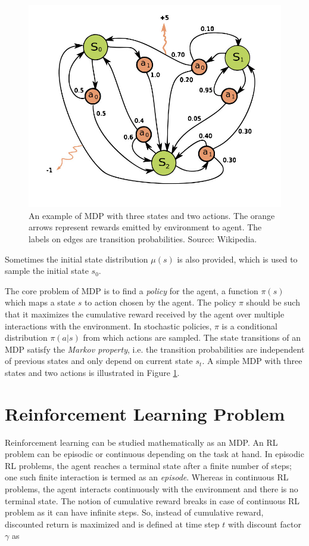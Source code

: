 \begin{figure}[!htb]
    \centering
    \includegraphics[width=.8\linewidth]{figures/02/mdp.jpg}
    \caption{An example of MDP with three states and two actions. The orange arrows represent rewards emitted by environment to agent. The labels on edges are transition probabilities. Source: Wikipedia.}
    \label{fig:02_mdp}
\end{figure}

Sometimes the initial state distribution $\mu(s)$ is also provided, which is used to sample the initial state $s_0$.

The core problem of MDP is to find a \textit{policy} for the agent, a function $\pi(s)$ which maps a state $s$ to action chosen by the agent. The policy $\pi$ should be such that it maximizes the cumulative reward received by the agent over multiple interactions with the environment. In stochastic policies, $\pi$ is a conditional distribution $\pi(a|s)$ from which actions are sampled. The state transitions of an MDP satisfy the \textit{Markov property}, i.e. the transition probabilities are independent of previous states and only depend on current state $s_t$. A simple MDP with three states and two actions is illustrated in Figure \ref{fig:02_mdp}.


\section{Reinforcement Learning Problem}
Reinforcement learning can be studied mathematically as an MDP. An RL problem can be episodic or continuous depending on the task at hand. In episodic RL problems, the agent reaches a terminal state after a finite number of steps; one such finite interaction is termed as an \textit{episode}. Whereas in continuous RL problems, the agent interacts continuously with the environment and there is no terminal state. The notion of cumulative reward breaks in case of continuous RL problem as it can have infinite steps. So, instead of cumulative reward, discounted return is maximized and is defined at time step $t$ with discount factor $\gamma$ as 

